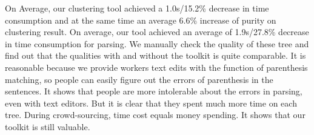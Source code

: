 On Average, our clustering tool achieved a 1.0s/15.2\% decrease in time consumption and at the same time an average 6.6\% increase of purity on clustering result. On average, our tool achieved an average of 1.9s/27.8\% decrease in time consumption for parsing. We manually check the quality of these tree and find out that the qualities with and without the toolkit is quite comparable. It is reasonable because we provide workers text edits with the function of parenthesis matching, so people can easily figure out the errors of parenthesis in the sentences. It shows that people are more intolerable about the errors in parsing, even with text editors. But it is clear that they spent much more time on each tree. During crowd-sourcing, time cost equals money spending. It shows that our toolkit is still valuable.



